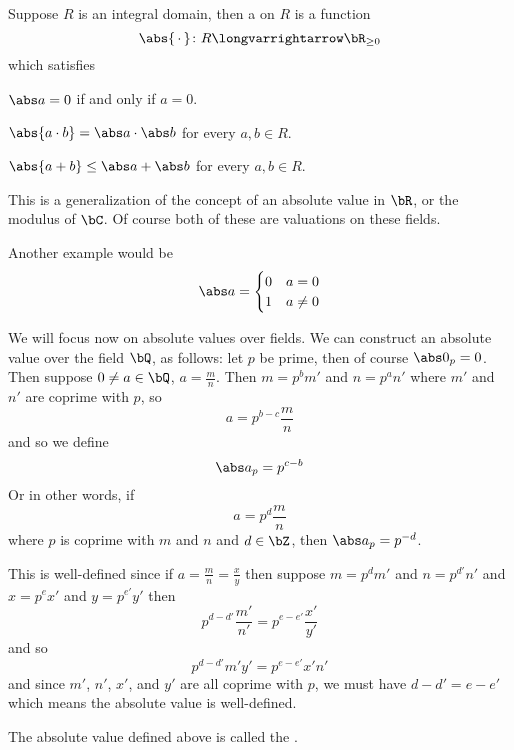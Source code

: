 \documentclass[10pt]{article}
\let\longto=\longvarrightarrow
\begin{document}


\bigskip

\begin{defn*}

    Suppose $R$ is an integral domain, then a  on $R$ is a function
    \[ \abs{\,\cdot\,}\colon R\longto\bR_{\geq0} \]
    which satisfies
    \benum
        \item $\abs a=0$ if and only if $a=0$.
        \item $\abs{a\cdot b}=\abs a\cdot\abs b$ for every $a,b\in R$.
        \item $\abs{a+b}\leq\abs a+\abs b$ for every $a,b\in R$.
    \eenum

\end{defn*}

This is a generalization of the concept of an absolute value in $\bR$, or the modulus of $\bC$.
Of course both of these are valuations on these fields.

Another example would be
\[ \abs a = \begin{cases} 0 & a=0 \\ 1 & a\neq 0 \end{cases} \]

We will focus now on absolute values over fields.
We can construct an absolute value over the field $\bQ$, as follows: let $p$ be prime, then of course $\abs 0_p=0$.
Then suppose $0\neq a\in\bQ$, $a=\frac mn$.
Then $m=p^bm'$ and $n=p^an'$ where $m'$ and $n'$ are coprime with $p$, so
\[ a = p^{b-c}\frac mn \]
and so we define
\[ \abs a_p = p^{c-b} \]
Or in other words, if
\[ a = p^d\frac mn \]
where $p$ is coprime with $m$ and $n$ and $d\in\bZ$, then $\abs a_p=p^{-d}$.

This is well-defined since if $a=\frac mn=\frac xy$ then suppose $m=p^dm'$ and $n=p^{d'}n'$ and $x=p^ex'$ and $y=p^{e'}y'$ then
\[ p^{d-d'}\frac{m'}{n'} = p^{e-e'}\frac{x'}{y'} \]
and so
\[ p^{d-d'}m'y' = p^{e-e'}x'n' \]
and since $m'$, $n'$, $x'$, and $y'$ are all coprime with $p$, we must have $d-d'=e-e'$ which means the absolute value is well-defined.

\begin{defn*}

    The absolute value defined above is called the .

\end{defn*}
\end{document}
